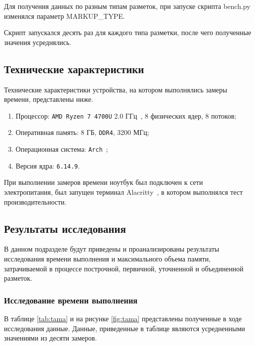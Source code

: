 \newpage

Для получения данных по разным типам разметок, при запуске скрипта bench.py изменялся параметр MARKUP\_TYPE.

Скрипт запускался десять раз для каждого типа разметки, после чего полученные значения усреднялись.


\subsection{Технические характеристики}

Технические характеристики устройства, на котором выполнялись замеры времени, представлены ниже.
\begin{enumerate}
    \item Процессор: \texttt{AMD Ryzen 7 4700U} 2.0 ГГц~\cite{amd}, 8 физических ядер, 8 потоков;
    \item Оперативная память: 8 ГБ, \texttt{DDR4}, 3200 МГц;
    \item Операционная система: \texttt{Arch}~\cite{arch};
    \item Версия ядра: \texttt{6.14.9}.
\end{enumerate}

При выполнении замеров времени ноутбук был подключен к сети электропитания, был запущен терминал Alacritty~\cite{alacritty}, в котором выполнялся тест производительности.

\subsection{Результаты исследования}

В данном подразделе будут приведены и проанализированы результаты исследования времени выполнения и максимального объема памяти, затрачиваемой в процессе построчной, первичной, уточненной и объединенной разметок.

\newpage

\subsubsection{Исследование времени выполнения}

В таблице \ref{tab:tama} и на рисунке \ref{fig:tama} представлены полученные в ходе исследования данные.
Данные, приведенные в таблице являются усредненными значениями из десяти замеров.

